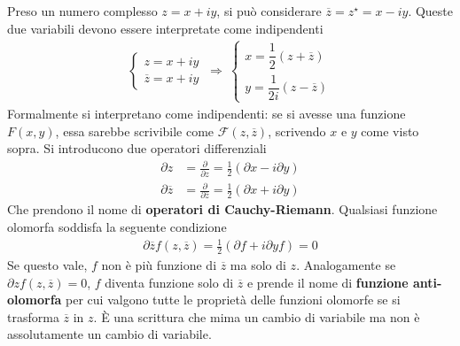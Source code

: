 \documentclass[a4paper, oneside]{article}
\begin{document}
\begin{definition}
    Preso un numero complesso $z = x + iy$, si può considerare $\overline{z} = z^{\star} = x - iy$.
    Queste due variabili devono essere interpretate come indipendenti  
    \begin{gather*}
        \left\{\begin{array}{l}
            z = x + iy \\
            \overline{z} = x + iy 
        \end{array}\right. \ \Longrightarrow \ \left\{\begin{array}{l}
            x = \dfrac{1}{2}(z + \overline{z} ) \\
            y = \dfrac{1}{2i}(z - \overline{z} )
        \end{array}\right.
    \end{gather*}
    Formalmente si interpretano come indipendenti: se si avesse una funzione $F(x, y)$, essa
    sarebbe scrivibile come $\mathcal{F}(z, \overline{z} )$, scrivendo $x$ e $y$
    come visto sopra. Si introducono due operatori differenziali
    \begin{align}
        \partial z &= \frac{\partial}{\partial z} = \frac{1}{2}(\partial x - i\partial y) \\
        \partial \overline{z} &= \frac{\partial }{\partial \overline{z} } = \frac{1}{2} (\partial x + i \partial y)  
    \end{align}
    Che prendono il nome di \textbf{operatori di Cauchy-Riemann}. Qualsiasi funzione olomorfa soddisfa
    la seguente condizione
    \begin{align}
        \partial \overline{z} f(z, \overline{z} ) = \frac{1}{2}(\partial f + i \partial y f) = 0 
    \end{align}
    Se questo vale, $f$ non è più funzione di $\overline{z}$ ma solo di $z$. Analogamente se
    $\partial z f(z, \overline{z}) = 0$, $f$ diventa funzione solo di $\overline{z}$ e prende il 
    nome di \textbf{funzione anti-olomorfa} per cui valgono tutte le proprietà delle funzioni 
    olomorfe se si trasforma $\overline{z}$ in $z$. È una scrittura che 
    mima un cambio di variabile ma non è assolutamente un cambio di variabile. 
\end{definition}
\end{document}
